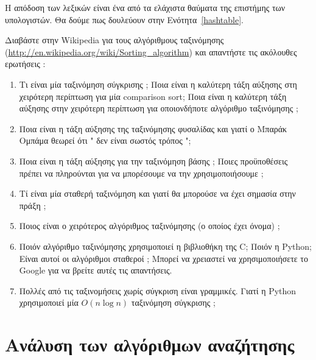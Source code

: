 \documentclass[10pt]{book}
\begin{document}
Η απόδοση των λεξικών είναι ένα από τα ελάχιστα θαύματα της επιστήμης των 
υπολογιστών. Θα δούμε πως δουλεύουν στην Ενότητα~\ref{hashtable}. 



\begin{exercise}

Διαβάστε στην Wikipedia για τους αλγόριθμους ταξινόμησης  
(\url{http://en.wikipedia.org/wiki/Sorting_algorithm}) και απαντήστε 
τις ακόλουθες ερωτήσεις : 

\begin{enumerate}

\item Τι είναι μία ταξινόμηση σύγκρισης ;   Ποια είναι η καλύτερη τάξη    
  αύξησης στη χειρότερη περίπτωση για μία  comparison sort;   Ποια είναι η 
  καλύτερη τάξη αύξησης στην χειρότερη περίπτωση για οποιονδήποτε αλγόριθμο 
  ταξινόμησης ; 

\item Ποια είναι η τάξη αύξησης της ταξινόμησης φυσαλίδας και γιατί ο Μπαράκ   
  Ομπάμα θεωρεί ότι  " δεν είναι σωστός τρόπος "; 

\item Ποια είναι η τάξη αύξησης για την ταξινόμηση βάσης ;   Ποιες 
  προϋποθέσεις πρέπει να πληρούνται για να μπορέσουμε να την χρησιμοποιήσουμε ; 

\item Τί είναι μία σταθερή ταξινόμηση και γιατί θα μπορούσε να έχει σημασία στην 
  πράξη ; 

\item Ποιος είναι ο χειρότερος αλγόριθμος ταξινόμησης (ο οποίος έχει όνομα) ; 

\item Ποιόν αλγόριθμο ταξινόμησης χρησιμοποιεί η βιβλιοθήκη της  C;   Ποιόν 
  η  Python;   Είναι αυτοί οι αλγόριθμοι σταθεροί ;   Μπορεί να 
  χρειαστεί να χρησιμοποιήσετε το  Google  για να βρείτε αυτές τις 
  απαντήσεις.

\item Πολλές από τις ταξινομήσεις χωρίς σύγκριση είναι γραμμικές. Γιατί η  
  Python χρησιμοποιεί μία $O(n \log n)$ ταξινόμηση σύγκρισης ; 

\end{enumerate}
\end{exercise}



\section{Ανάλυση των αλγόριθμων αναζήτησης}
\end{document}
